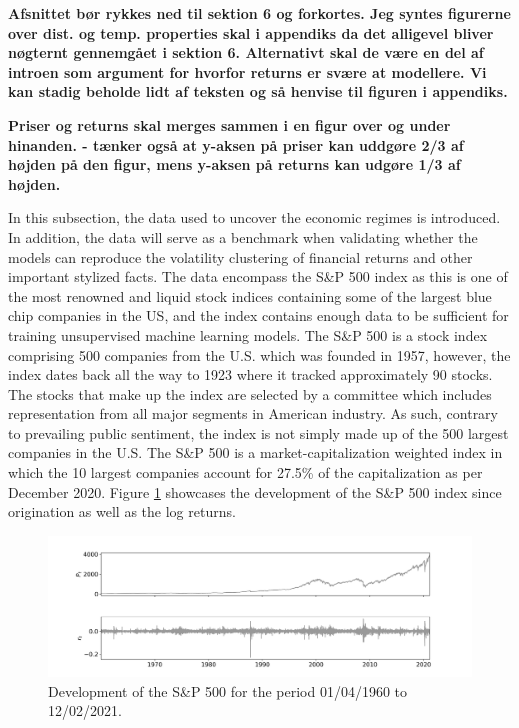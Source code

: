 \textbf{Afsnittet bør rykkes ned til sektion 6 og forkortes. Jeg syntes figurerne over dist. og temp. properties skal i appendiks da det alligevel bliver nøgternt gennemgået i sektion 6. Alternativt skal de være en del af introen som argument for hvorfor returns er svære at modellere. Vi kan stadig beholde lidt af teksten og så henvise til figuren i appendiks.}

\textbf{Priser og returns skal merges sammen i en figur over og under hinanden. - tænker også at y-aksen på priser kan uddgøre 2/3 af højden på den figur, mens y-aksen på returns kan udgøre 1/3 af højden.}

In this subsection, the data used to uncover the economic regimes is introduced. In addition, the data will serve as a benchmark when validating whether the models can reproduce the volatility clustering of financial returns and other important stylized facts. The data encompass the S\&P 500 index as this is one of the most renowned and liquid stock indices containing some of the largest blue chip companies in the US, and the index contains enough data to be sufficient for training unsupervised machine learning models. The S\&P 500 is a stock index comprising 500 companies from the U.S. which was founded in 1957, however, the index dates back all the way to 1923 where it tracked approximately 90 stocks. The stocks that make up the index are selected by a committee which includes representation from all major segments in American industry. As such, contrary to prevailing public sentiment, the index is not simply made up of the 500 largest companies in the U.S. The S\&P 500 is a market-capitalization weighted index in which the 10 largest companies account for 27.5\% of the capitalization as per December 2020. Figure \ref{fig: SP500_index} showcases the development of the S\&P 500 index since origination as well as the log returns. 
 
\begin{figure}[H] 
    \centering
    \includegraphics[width=1\textwidth]{analysis/data_description/images/SP500_index.png}
    \caption [Development of the S\&P 500] {Development of the S\&P 500 for the period 01/04/1960 to 12/02/2021.}
    \label{fig: SP500_index}
\end{figure}

